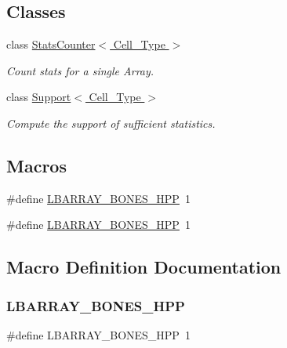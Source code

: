 \subsection*{Classes}
\begin{DoxyCompactItemize}
\item 
class \hyperlink{class_stats_counter}{Stats\+Counter$<$ Cell\+\_\+\+Type $>$}
\begin{DoxyCompactList}\small\item\em Count stats for a single Array. \end{DoxyCompactList}\item 
class \hyperlink{class_support}{Support$<$ Cell\+\_\+\+Type $>$}
\begin{DoxyCompactList}\small\item\em Compute the support of sufficient statistics. \end{DoxyCompactList}\end{DoxyCompactItemize}
\subsection*{Macros}
\begin{DoxyCompactItemize}
\item 
\#define \hyperlink{barray_8hpp_a2e083e962cf853c1cedee3e82747b9d0}{L\+B\+A\+R\+R\+A\+Y\+\_\+\+B\+O\+N\+E\+S\+\_\+\+H\+PP}~1
\item 
\#define \hyperlink{lbarray-bones_8hpp_a2e083e962cf853c1cedee3e82747b9d0}{L\+B\+A\+R\+R\+A\+Y\+\_\+\+B\+O\+N\+E\+S\+\_\+\+H\+PP}~1
\end{DoxyCompactItemize}


\subsection{Macro Definition Documentation}
\mbox{\label{barray_8hpp_a2e083e962cf853c1cedee3e82747b9d0}} 
\subsubsection{\texorpdfstring{L\+B\+A\+R\+R\+A\+Y\+\_\+\+B\+O\+N\+E\+S\+\_\+\+H\+PP}{LBARRAY\_BONES\_HPP}\hspace{0.1cm}{\footnotesize\ttfamily [1/2]}}
{\footnotesize\ttfamily \#define L\+B\+A\+R\+R\+A\+Y\+\_\+\+B\+O\+N\+E\+S\+\_\+\+H\+PP~1}

